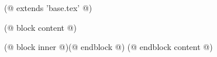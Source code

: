 (@ extends 'base.tex' @)

(@ block content @)
    \thispagestyle{seminar-booklet-first}

    \afterpage{\globaldefs=1\restoregeometry}

    (@ block inner @)(@ endblock @)
(@ endblock content @)
